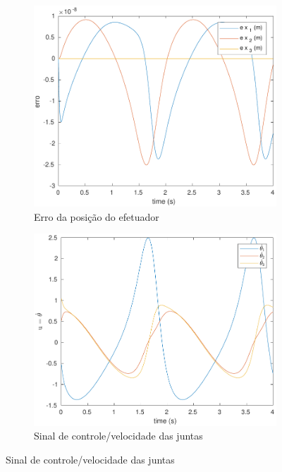 \documentclass[a4paper,11pt]{article}
\theoremstyle{mytheor}
\begin{document}
\begin{figure}[!ht]
\begin{minipage}{\linewidth}
\begin{subfigure}[b]{0.49\textwidth}
    \includegraphics[width=1\textwidth]{figs/ex2_2a_e.pdf}
    \caption{Erro da posição do efetuador}
    \label{fig:ex2_2a_e}
    \end{subfigure}
  \end{minipage}
  \begin{minipage}{\linewidth}
  \centering
    \begin{subfigure}[b]{0.49\textwidth}
    \includegraphics[width=1\textwidth]{figs/ex2_2a_dq.pdf}
    \caption{Sinal de controle/velocidade das juntas}
    \label{fig:ex2_2a_dq}
    \end{subfigure}

\end{minipage}
\end{figure}
\end{document}
